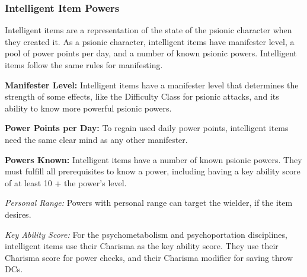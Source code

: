 \subsubsection{Intelligent Item Powers}
Intelligent items are a representation of the state of the psionic character when they created it. As a psionic character, intelligent items have manifester level, a pool of power points per day, and a number of known psionic powers. Intelligent items follow the same rules for manifesting.

\textbf{Manifester Level:} Intelligent items have a manifester level that determines the strength of some effects, like the Difficulty Class for psionic attacks, and its ability to know more powerful psionic powers.

\textbf{Power Points per Day:} To regain used daily power points, intelligent items need the same clear mind as any other manifester.

\textbf{Powers Known:} Intelligent items have a number of known psionic powers. They must fulfill all prerequisites to know a power, including having a key ability score of at least 10 + the power's level.

\textit{Personal Range:} Powers with personal range can target the wielder, if the item desires.

\textit{Key Ability Score:} For the psychometabolism and psychoportation disciplines, intelligent items use their Charisma as the key ability score. They use their Charisma score for power checks, and their Charisma modifier for saving throw DCs.

